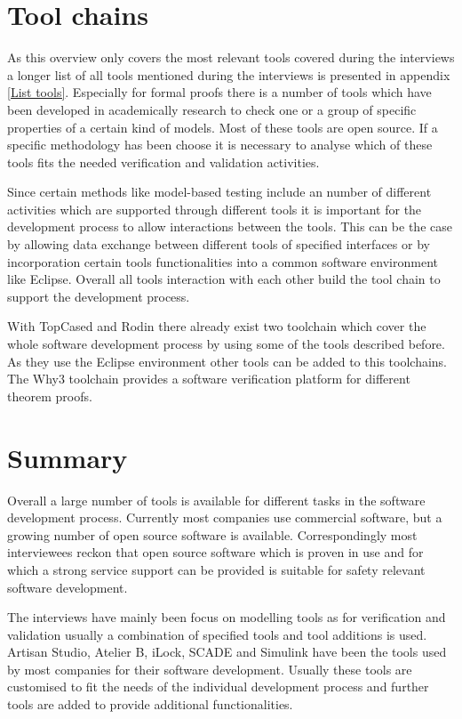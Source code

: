 \documentclass{./template/openetcs_report}
\begin{document}
\section{Tool chains}
As this overview only covers the most relevant tools covered during the interviews a longer list of all tools mentioned during the interviews is presented in appendix \ref{List tools}. Especially for formal proofs there is a number of tools which have been developed in academically research to check one or a group of specific properties of a certain kind of models. Most of these tools are open source. If a specific methodology has been choose it is necessary to analyse which of these tools fits the needed verification and validation activities.

Since certain methods like model-based testing include an number of different activities which are supported through different tools it is important for the development process to allow interactions between the tools. This can be the case by allowing data exchange between different tools of specified interfaces or by incorporation certain tools functionalities into a common software  environment like Eclipse. Overall all tools interaction with each other build the tool chain to support the development process. 

With TopCased and Rodin there already exist two toolchain which cover the whole software development process by using some of the tools described before. As they use the Eclipse environment other tools can be added to this toolchains. The Why3 toolchain provides a software verification platform for different theorem proofs. 


\section{Summary}

Overall a large number of tools is available for different tasks in the software development process. Currently most companies use commercial software, but a growing number of open source software is available.  Correspondingly most interviewees reckon that open source software which is proven in use and for which a strong service support can be provided is suitable for  safety relevant software development. 

The interviews have mainly been focus on modelling tools as for verification and validation usually a combination of specified tools and tool additions is used. Artisan Studio, Atelier B, iLock, SCADE and Simulink have been the tools used by most companies for their software development. Usually these tools are  customised to fit the needs of the individual development process and further tools are added to provide additional functionalities.
\end{document}
